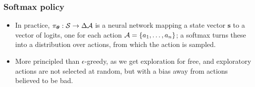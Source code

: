 \begin{frame}
    \frametitle{Softmax policy}
    
    \begin{itemize}
    \item In practice, $\pi_{\boldsymbol{\theta}} : \mathcal{S} \to \Delta \mathcal{A}$ is a neural network mapping a state vector $\mathbf{s}$ to 
    a vector of logits, one for each action $\mathcal{A} = \{a_1, \ldots, a_n\}$;
    a softmax turns these into a distribution over actions,
    from which the action is sampled.
    \item More principled than $\epsilon$-greedy, as we get exploration for free,
    and exploratory actions are not selected at random, but with a bias away from
	actions believed to be bad.
\end{itemize}
\end{frame}
%
%
%      
